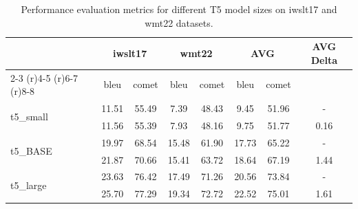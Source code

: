 \documentclass{article}
\begin{document}
\begin{table}[ht]
    \centering
    \begin{tabular}{lccccccc}
        \toprule
        & \multicolumn{2}{c}{iwslt17} & \multicolumn{2}{c}{wmt22} & \multicolumn{2}{c}{AVG} & \multicolumn{1}{c}{AVG Delta} \\
        \cmidrule(r){2-3} \cmidrule(r){4-5} \cmidrule(r){6-7} \cmidrule(r){8-8}
        & bleu & comet & bleu & comet & bleu & comet & \\
        \midrule
        \multirow{2}{*}{t5\_small} 
        & 11.51 & 55.49 & 7.39 & 48.43 & 9.45 & 51.96 & - \\
        & 11.56 & 55.39 & 7.93 & 48.16 & 9.75 & 51.77 & 0.16 \\
        \multirow{2}{*}{t5\_BASE} 
        & 19.97 & 68.54 & 15.48 & 61.90 & 17.73 & 65.22 & - \\
        & 21.87 & 70.66 & 15.41 & 63.72 & 18.64 & 67.19 & 1.44 \\
        \multirow{2}{*}{t5\_large} 
        & 23.63 & 76.42 & 17.49 & 71.26 & 20.56 & 73.84 & - \\
        & 25.70 & 77.29 & 19.34 & 72.72 & 22.52 & 75.01 & 1.61 \\
        \bottomrule
    \end{tabular}
    \caption{Performance evaluation metrics for different T5 model sizes on iwslt17 and wmt22 datasets.}
    \label{tab:performance}
\end{table}
\end{document}
